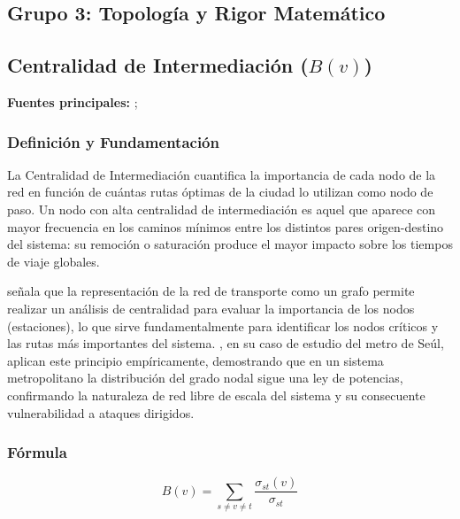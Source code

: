 \subsection*{Grupo 3: Topología y Rigor Matemático}
 
\subsection{Centralidad de Intermediación \texorpdfstring{($B(v)$)}{(B(v))}}
\label{subsec:centralidad-intermediacion}
 
\textbf{Fuentes principales:} \citet{lee2008}; \citet{allauca2023}
 
\subsubsection{Definición y Fundamentación}
 
La Centralidad de Intermediación cuantifica la importancia de cada nodo de la
red
en función de cuántas rutas óptimas de la ciudad lo utilizan como nodo de paso.
Un nodo con alta centralidad de intermediación es aquel que aparece con mayor
frecuencia en los caminos mínimos entre los distintos pares origen-destino del
sistema: su remoción o saturación produce el mayor impacto sobre los tiempos de
viaje globales.
 
\citet{allauca2023} señala que la representación de la red de transporte como
un
grafo permite realizar un análisis de centralidad para evaluar la importancia de
los
nodos (estaciones), lo que sirve fundamentalmente para identificar los nodos
críticos
y las rutas más importantes del sistema. \citet{lee2008}, en su caso de
estudio
del metro de Seúl, aplican este principio empíricamente, demostrando que en un
sistema metropolitano la distribución del grado nodal sigue una ley de
potencias,
confirmando la naturaleza de red libre de escala del sistema y su consecuente
vulnerabilidad a ataques dirigidos.
 
\subsubsection{Fórmula}
 
\begin{equation}
    B(v) = \sum_{s \neq v \neq t} \frac{\sigma_{st}(v)}{\sigma_{st}}
    \label{eq:betweenness}
\end{equation}
 
